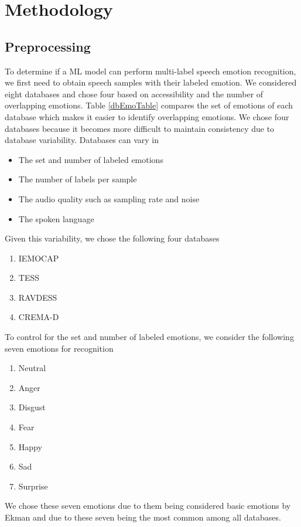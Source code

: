 \documentclass[conference]{IEEEtran}
\begin{document}
\section{Methodology}

\subsection{Preprocessing}

To determine if a ML model can perform multi-label speech emotion recognition, we first need to obtain speech samples with their labeled emotion. We considered eight databases and chose four based on accessibility and the number of overlapping emotions. Table \ref{dbEmoTable} compares the set of emotions of each database which makes it easier to identify overlapping emotions. We chose four databases because it becomes more difficult to maintain consistency due to database variability. Databases can vary in
\begin{itemize}
	\item The set and number of labeled emotions
	\item The number of labels per sample
	\item The audio quality such as sampling rate and noise
	\item The spoken language
\end{itemize}
Given this variability, we chose the following four databases
\begin{enumerate}
	\item IEMOCAP \cite{busso_2008}
	\item TESS \cite{dupuis_2011}
	\item RAVDESS \cite{livingstone_2018}
	\item CREMA-D \cite{cao_2014}
\end{enumerate}

To control for the set and number of labeled emotions, we consider the following seven emotions for recognition
\begin{enumerate}
	\item Neutral
	\item Anger
	\item Disgust
	\item Fear
	\item Happy
	\item Sad
	\item Surprise
\end{enumerate}
We chose these seven emotions due to them being considered basic emotions by Ekman \cite{Ekman1992} and due to these seven being the most common among all databases. 
\end{document}
